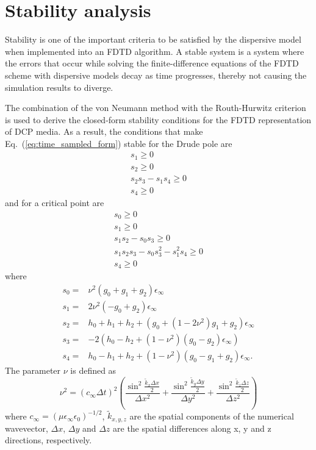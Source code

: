 \section{Stability analysis}
Stability is one of the important criteria to be satisfied by the dispersive model when implemented into an FDTD algorithm. A stable system is a system where the errors that occur while solving the finite-difference equations of the FDTD scheme with dispersive models decay as time progresses, thereby not causing the simulation results to diverge.
  
The combination of the von Neumann method with the Routh-Hurwitz criterion \cite{pereda_analyzing_2001} is used to derive the closed-form stability conditions for the FDTD representation of DCP media. As a result, the conditions that make Eq.~(\ref{eq:time_sampled_form}) stable for the Drude pole are
\begin{equation}
\begin{split}
s_1 \ge 0\\
s_2 \ge 0\\
s_2 s_3 - s_1 s_4 \ge 0\\
s_4 \ge 0
\end{split}
\end{equation}
and for a critical point are
\begin{equation}
\begin{split}
s_0 \ge 0\\
s_1 \ge 0\\
s_1 s_2 - s_0 s_3 \ge 0\\
s_1 s_2 s_3 -s_0 s_3^2 - s_1^2 s_4 \ge 0\\
s_4 \ge 0
\end{split}
\end{equation} 
where
\begin{equation}
\begin{split} 
s_0 = & \nu^2 \left( g_0 + g_1 + g_2 \right) \epsilon_\infty\\
s_1 = & 2 \nu^2 \left( -g_0 + g_2 \right) \epsilon_\infty\\
s_2 = & h_0 + h_1 + h_2 + \left( g_0 + \left( 1 - 2 \nu^2 \right) g_1 + g_2\right) \epsilon_\infty\\
s_3 = & -2 \left( h_0 - h_2 + \left( 1 - \nu^2 \right) \left( g_0 - g_2 \right) \epsilon_\infty \right)\\
s_4 = & h_0 - h_1 + h_2 + \left( 1 - \nu^2 \right) \left( g_0 - g_1 + g_2 \right) \epsilon_\infty.
\end{split}
\end{equation}
The parameter $\nu$ is defined as
\begin{equation}
\nu^2 = (c_\infty \Delta t)^2 \left ( \frac{\sin^2 \frac{\tilde{k}_x \Delta x}{2}}{\Delta x^2} + \frac{\sin^2 \frac{\tilde{k}_y \Delta y}{2}}{\Delta y^2} + \frac{\sin^2 \frac{\tilde{k}_z \Delta z}{2}}{\Delta z^2} \right )
\end{equation}
where $c_\infty = (\mu \epsilon_\infty \epsilon_0)^{-1/2}$, $\tilde k_{x,y,z}$ are the spatial components of the numerical wavevector, $\Delta x$, $\Delta y$ and $\Delta z$ are the spatial differences along x, y and z directions, respectively. 


